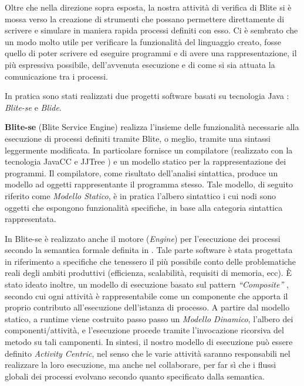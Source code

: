 Oltre che nella direzione sopra esposta, la nostra attività di verifica di
Blite si è mossa verso la creazione di strumenti che possano permettere
direttamente di scrivere e simulare in maniera rapida processi definiti con
esso. Ci è sembrato che un modo molto utile per verificare la funzionalità del
linguaggio creato, fosse quello di poter scrivere ed eseguire programmi e di avere una
rappresentazione, il più espressiva possibile, dell'avvenuta esecuzione e di
come si sia attuata la comunicazione tra i processi.

In pratica sono stati realizzati due progetti software basati su tecnologia
Java \cite{Java}: \emph{Blite-se} e \emph{Blide}. 

\textbf{Blite-se} (Blite Service Engine) realizza l'insieme delle funzionalità
necessarie alla esecuzione di processi definiti tramite Blite, o meglio, tramite
una sintassi leggermente modificata. In particolare fornisce un compilatore
(realizzato con la tecnologia JavaCC e JJTree \cite{JavaCC}) e un modello
statico per la rappresentazione dei programmi. Il compilatore, come risultato
dell'analisi sintattica, produce un modello ad oggetti rappresentante il programma stesso.
Tale modello, di seguito riferito come \emph{Modello Statico}, è in pratica
l'albero sintattico i cui nodi sono oggetti che espongono funzionalità
specifiche, in base alla categoria sintattica rappresentata.

In Blite-se è realizzato anche il motore (\emph{Engine}) per l'esecuzione dei
processi secondo la semantica formale definita in \cite{LaPuTie1}. Tale parte
software è stata progettata in riferimento a specifiche che tenessero il più
possibile conto delle problematiche reali degli ambiti produttivi (efficienza,
scalabilità, requisiti di memoria, ecc). \`E stato ideato inoltre, un modello di
esecuzione basato sul pattern \emph{``Composite''} \cite{GANGo4}, secondo cui
ogni attività è rappresentabile come un componente che apporta il proprio
contributo all'esecuzione dell'istanza di processo. A partire dal modello
statico, a runtime viene costruito passo passo un \emph{Modello Dinamico},
l'albero dei componenti/attività, e l'esecuzione procede tramite l'invocazione
ricorsiva del metodo  su tali camponenti. In sintesi, il
nostro modello di esecuzione può essere definito \emph{Activity Centric}, nel
senso che le varie attività saranno responsabili nel realizzare la loro
esecuzione, ma anche nel collaborare, per far sì che i flussi globali dei
processi evolvano secondo quanto specificato dalla semantica.

